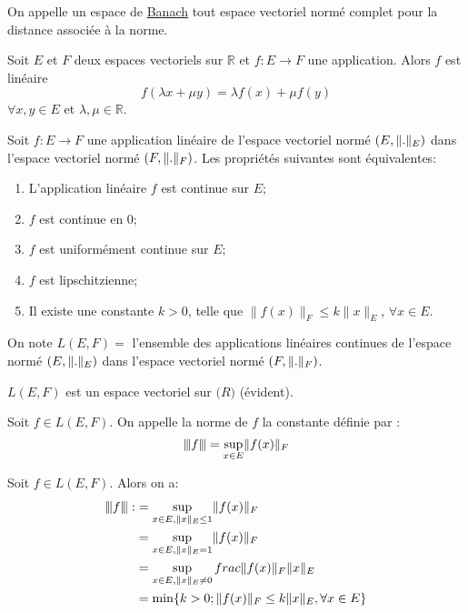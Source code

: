 \documentclass[12pt,a4paper]{article}
\begin{document}
\begin{flushleft}
\begin{mydef}
On appelle un espace de \underline{Banach} tout espace vectoriel normé complet pour la distance associée à la norme. 
\end{mydef}

\begin{rap}
Soit $E$ et $F$ deux espaces vectoriels sur $\mathbb{R}$ et $f: E \longrightarrow F$ une application. Alors $f$ est linéaire \ssi $$f( \lambda x + \mu y) = \lambda f(x) + \mu f(y)$$
$\forall x,y \in E$ et $\lambda , \mu \in \mathbb{R}$.
\end{rap}

\begin{thm}
Soit $f:E \longrightarrow F$ une application linéaire de l'espace vectoriel normé $(E, \lVert . \rVert_E)$ dans l'espace vectoriel normé $(F, \lVert . \rVert_F)$. Les propriétés suivantes sont équivalentes:
\begin{enumerate}
\item L'application linéaire $f$ est continue sur $E$;
\item $f$ est continue en 0;
\item $f$ est uniformément continue sur $E$;
\item $f$ est lipschitzienne;
\item Il existe une constante $k > 0$, telle que $\lVert f(x) \rVert_F \leq k \lVert x \rVert_E$, $\forall x \in E$.
\end{enumerate}
\end{thm}

On note $L(E,F)  =$ l'ensemble des applications linéaires continues de l'espace normé $(E, \lVert . \rVert_E)$ dans l'espace vectoriel normé $(F, \lVert . \rVert_F)$.

\begin{rem}
$L(E,F)$ est un espace vectoriel sur $\mathbb(R)$ (évident).
\end{rem}

\begin{mydef}
Soit $f \in L(E,F)$. On appelle la norme de $f$ la constante définie par : $${\left\vert\kern-0.25ex\left\vert\kern-0.25ex\left\vert f \right\vert\kern-0.25ex\right\vert\kern-0.25ex\right\vert} = \sup\limits_{x \in E} \lVert f(x) \rVert_F$$
\end{mydef}

\begin{thm}
Soit $f \in L(E,F)$. Alors on a: 
\begin{align*}
{\left\vert\kern-0.25ex\left\vert\kern-0.25ex\left\vert f \right\vert\kern-0.25ex\right\vert\kern-0.25ex\right\vert} : &= \sup\limits_{x \in E , \lVert x \rVert_E \leq 1} \lVert f(x) \rVert_F\\
	       &=\sup\limits_{x \in E , \lVert x \rVert_E = 1} \lVert f(x) \rVert_F\\
		&= \sup\limits_{x \in E , \lVert x \rVert_E \neq 0} frac{\lVert f(x) \rVert_F}{\lVert x \rVert_E}\\
		&= \min \{ k > 0; \lVert f(x) \rVert_F \leq k \lVert x \rVert_E , \forall x \in E \}
\end{align*}
\end{thm}


\end{flushleft}
\end{document}
